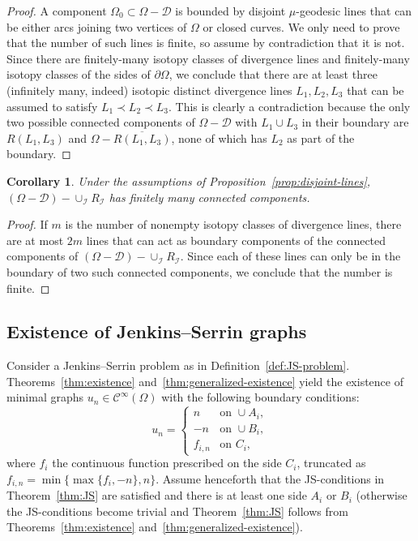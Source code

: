 \documentclass[a4paper,10pt,reqno]{amsart}
\newcommand{\sm}{-}
\newtheorem{corollary}[theorem]{Corollary}
\theoremstyle{definition}
\theoremstyle{remark}
\numberwithin{equation}{section}
\begin{document}
\begin{proof}
A component $\Omega_0\subset\Omega\sm\mathcal D$ is bounded by disjoint $\mu$-geodesic lines that can be either arcs joining two vertices of $\Omega$ or closed curves. We only need to prove that the number of such lines is finite, so assume by contradiction that it is not. Since there are finitely-many isotopy classes of divergence lines and finitely-many isotopy classes of the sides of $\partial\Omega$, we conclude that there are at least three (infinitely many, indeed) isotopic distinct divergence lines $L_1,L_2,L_3$ that can be assumed to satisfy $L_1\prec L_2\prec L_3$. This is clearly a contradiction because the only two possible connected components of $\Omega\sm\mathcal D$ with $L_1\cup L_3$ in their boundary are $R(L_1,L_3)$ and $\Omega\sm\overline{R(L_1,L_3)}$, none of which has $L_2$ as part of the boundary.
\end{proof}

\begin{corollary}\label{coro:finite-convergence-components}
Under the assumptions of Proposition~\ref{prop:disjoint-lines}, $(\Omega\sm\mathcal D)\sm\cup_{\mathcal I}R_{\mathcal I}$ has finitely many connected components.
\end{corollary}

\begin{proof}
If $m$ is the number of nonempty isotopy classes of divergence lines, there are at most $2m$ lines that can act as boundary components of the connected components of $(\Omega\sm\mathcal D)\sm\cup_{\mathcal I}R_{\mathcal I}$. Since each of these lines can only be in the boundary of two such connected components, we conclude that the number is finite.
\end{proof}


\subsection{Existence of Jenkins--Serrin graphs}\label{subsec:existence-JS}

Consider a Jenkins--Serrin problem as in Definition~\ref{def:JS-problem}. Theorems~\ref{thm:existence} and~\ref{thm:generalized-existence} yield the existence of minimal graphs $u_n\in\mathcal C^\infty(\Omega)$ with the following boundary conditions:
\begin{equation}\label{eqn:sequence}
u_n=\begin{cases}
n&\text{on }\cup A_i,\\
-n&\text{on }\cup B_i,\\
f_{i,n}&\text{on }C_i,
\end{cases}
\end{equation}
where $f_i$ the continuous function prescribed on the side $C_i$, truncated as $f_{i,n}=\min\{\max\{f_i,-n\},n\}$.
Assume henceforth that the JS-conditions in Theorem~\ref{thm:JS} are satisfied and there is at least one side $A_i$ or $B_i$ (otherwise the JS-conditions become trivial and Theorem~\ref{thm:JS} follows from Theorems~\ref{thm:existence} and~\ref{thm:generalized-existence}).
\end{document}
